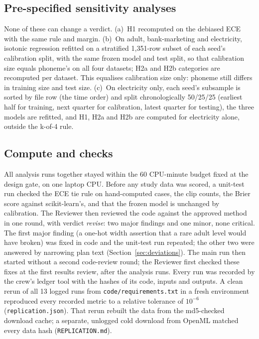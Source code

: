 \documentclass[11pt]{article}
\newcommand{\ds}[1]{\textsf{#1}}
\newcommand{\ad}{\ds{adult}}
\newcommand{\bm}{\ds{bank-marketing}}
\newcommand{\el}{\ds{electricity}}
\newcommand{\ph}{\ds{phoneme}}
\begin{document}
\subsection{Pre-specified sensitivity analyses}
\label{sec:sens-design}

None of these can change a verdict. (a)~H1 recomputed on the debiased ECE with the same rule
and margin. (b)~On \ad, \bm{} and \el, isotonic regression refitted on a stratified
1,351-row subset of each seed's calibration split, with the same frozen model and test split,
so that calibration size equals \ph's on all four datasets; H2a and H2b categories are
recomputed per dataset. This equalises calibration size only: \ph{} still differs in training
size and test size. (c)~On \el{} only, each seed's subsample is sorted by file row (the time
order) and split chronologically 50/25/25 (earliest half for training, next quarter for
calibration, latest quarter for testing), the three models are refitted, and H1, H2a and H2b
are computed for \el{} alone, outside the k-of-4 rule.

\subsection{Compute and checks}
\label{sec:compute}

All analysis runs together stayed within the 60 CPU-minute budget fixed at the design gate,
on one laptop CPU. Before any study data was scored, a unit-test run checked the ECE tie rule
on hand-computed cases, the clip counts, the Brier score against scikit-learn's, and that
the frozen model is unchanged by calibration. The Reviewer then reviewed the code against the
approved method in one round, with verdict \emph{revise}: two major findings and one minor,
none critical. The first major finding (a one-hot width assertion that a rare \ad{} level
would have broken) was fixed in code and the unit-test run repeated; the other two were
answered by narrowing plan text (Section~\ref{sec:deviations}). The main run then started
without a second code-review round; the Reviewer first checked these fixes at the first
results review, after the analysis runs. Every run was recorded by the crew's ledger tool
with the hashes of its code, inputs and outputs. A clean rerun of all 13 logged runs from
\texttt{code/requirements.txt} in a fresh environment reproduced every recorded metric to a
relative tolerance of $10^{-6}$ (\texttt{replication.json}). That rerun rebuilt the data from
the md5-checked download cache; a separate, unlogged cold download from OpenML matched every
data hash (\texttt{REPLICATION.md}).
\end{document}
